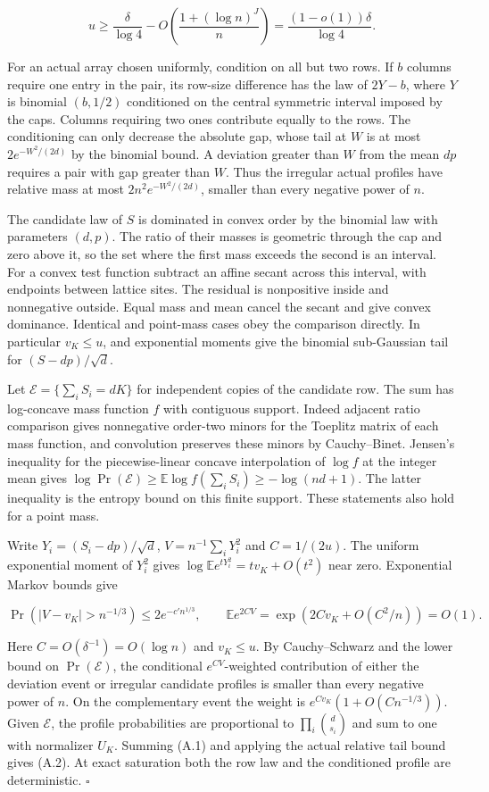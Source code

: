 \[
u\ge \frac{\delta}{\log4}-O\left(\frac{1+(\log n)^J}{n}\right)
  =\frac{(1-o(1))\delta}{\log4}.
\tag{A.3}
\]

For an actual array chosen uniformly, condition on all but two rows.
If $b$ columns require one entry in the pair, its row-size difference has
the law of $2Y-b$, where $Y$ is binomial $(b,1/2)$ conditioned on the
central symmetric interval imposed by the caps. Columns requiring two
ones contribute equally to the rows. The conditioning can only decrease
the absolute gap, whose tail at $W$ is at most $2e^{-W^2/(2d)}$ by the
binomial bound. A deviation greater than $W$ from the mean $dp$ requires
a pair with gap greater than $W$. Thus the irregular actual profiles
have relative mass at most $2n^2e^{-W^2/(2d)}$, smaller than every
negative power of $n$.

The candidate law of $S$ is dominated in convex order by the binomial
law with parameters $(d,p)$. The ratio of their masses is geometric
through the cap and zero above it, so the set where the first mass
exceeds the second is an interval. For a convex test function subtract
an affine secant across this interval, with endpoints between lattice
sites. The residual is nonpositive inside and nonnegative outside.
Equal mass and mean cancel the secant and give convex dominance.
Identical and point-mass cases obey the comparison directly. In
particular $v_K\le u$, and exponential moments give the binomial
sub-Gaussian tail for $(S-dp)/\sqrt d$.

Let $\mathcal E=\{\sum_iS_i=dK\}$ for independent copies of the candidate row. The sum has log-concave mass function $f$ with contiguous support. Indeed adjacent ratio comparison gives nonnegative order-two minors for the Toeplitz matrix of each mass function, and convolution preserves these minors by Cauchy--Binet. Jensen's inequality for the piecewise-linear concave interpolation of $\log f$ at the integer mean gives $\log\Pr(\mathcal E)\ge\mathbb E\log f(\sum_iS_i)\ge-\log(nd+1)$. The latter inequality is the entropy bound on this finite support. These statements also hold for a point mass.

Write $Y_i=(S_i-dp)/\sqrt d$, $V=n^{-1}\sum_iY_i^2$ and $C=1/(2u)$. The uniform exponential moment of $Y_i^2$ gives $\log\mathbb E e^{tY_i^2}=tv_K+O(t^2)$ near zero. Exponential Markov bounds give

\[
\Pr(|V-v_K|>n^{-1/3})\le 2e^{-c'n^{1/3}},
\qquad
\mathbb E e^{2CV}=\exp(2Cv_K+O(C^2/n))=O(1).
\]

Here $C=O(\delta^{-1})=O(\log n)$ and $v_K\le u$. By Cauchy--Schwarz and the lower bound on $\Pr(\mathcal E)$, the conditional $e^{CV}$-weighted contribution of either the deviation event or irregular candidate profiles is smaller than every negative power of $n$. On the complementary event the weight is $e^{Cv_K}(1+O(Cn^{-1/3}))$. Given $\mathcal E$, the profile probabilities are proportional to $\prod_i\binom d{s_i}$ and sum to one with normalizer $U_K$. Summing (A.1) and applying the actual relative tail bound gives (A.2). At exact saturation both the row law and the conditioned profile are deterministic. $\square$

